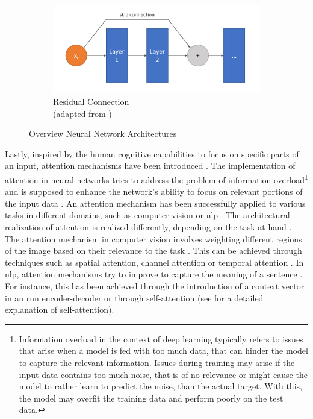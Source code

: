 \begin{figure}[H]
  \begin{subfigure}{0.6\textwidth}
    \centering
    \includegraphics[width=\linewidth]{images/resnet.png}
    \captionsetup{justification=centering}
    \caption{Residual Connection \\(adapted from \cite{hassan2019ResNet3450})} \label{fig:resnet}
  \end{subfigure}
\caption[Overview Neural Network Architectures]{Overview Neural Network Architectures} \label{fig:NN_architectures_Overview}
\end{figure}


Lastly, inspired by the human cognitive capabilities to focus on specific parts of an input, attention mechanisms have been introduced \cite{niu2021ReviewAttentionMechanism, aggarwal2018NeuralNetworksDeep}.
The implementation of attention in neural networks tries to address the problem of information overload\footnote{Information overload in the context of deep learning typically refers to issues that arise when a \gls{model} is fed with too much data, that can hinder the \gls{model} to capture the relevant information.
Issues during training may arise if the input data contains too much noise, that is of no relevance or might cause the \gls{model} to rather learn to predict the noise, than the actual target.
With this, the \gls{model} may overfit the training data and perform poorly on the test data.} and is supposed to enhance the network's ability to focus on relevant portions of the input data \cite{niu2021ReviewAttentionMechanism}.
An attention mechanism has been successfully applied to various tasks in different domains, such as computer vision or \gls{nlp} \cite{niu2021ReviewAttentionMechanism}.
The architectural realization of attention is realized differently, depending on the task at hand \cite{aggarwal2018NeuralNetworksDeep}.
The attention mechanism in computer vision involves weighting different regions of the image based on their relevance to the task \cite{aggarwal2018NeuralNetworksDeep}. 
This can be achieved through techniques such as spatial attention, channel attention or temporal attention \cite{guo2022AttentionMechanismsComputer}.
In \gls{nlp}, attention mechanisms try to improve to capture the meaning of a sentence \cite{niu2021ReviewAttentionMechanism}. 
For instance, this has been achieved through the introduction of a context vector in an \gls{rnn} encoder-decoder \cite{DBLP:journals/corr/BahdanauCB14} or through self-attention \cite{vaswani2017AttentionAllYou} (see  for a detailed explanation of self-attention).

